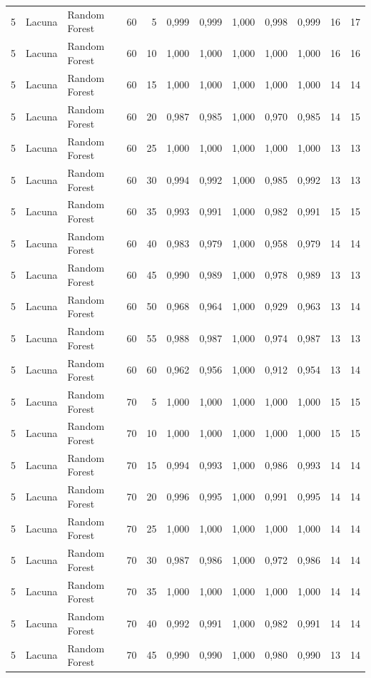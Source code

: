 \begin{longtable}{@{}rllrrrrrrrrr@{}}
5 & Lacuna & Random Forest & 60 & 5 & 0,999 & 0,999 & 1,000 & 0,998 & 0,999 & 16 & 17 \\
5 & Lacuna & Random Forest & 60 & 10 & 1,000 & 1,000 & 1,000 & 1,000 & 1,000 & 16 & 16 \\
5 & Lacuna & Random Forest & 60 & 15 & 1,000 & 1,000 & 1,000 & 1,000 & 1,000 & 14 & 14 \\
5 & Lacuna & Random Forest & 60 & 20 & 0,987 & 0,985 & 1,000 & 0,970 & 0,985 & 14 & 15 \\
5 & Lacuna & Random Forest & 60 & 25 & 1,000 & 1,000 & 1,000 & 1,000 & 1,000 & 13 & 13 \\
5 & Lacuna & Random Forest & 60 & 30 & 0,994 & 0,992 & 1,000 & 0,985 & 0,992 & 13 & 13 \\
5 & Lacuna & Random Forest & 60 & 35 & 0,993 & 0,991 & 1,000 & 0,982 & 0,991 & 15 & 15 \\
5 & Lacuna & Random Forest & 60 & 40 & 0,983 & 0,979 & 1,000 & 0,958 & 0,979 & 14 & 14 \\
5 & Lacuna & Random Forest & 60 & 45 & 0,990 & 0,989 & 1,000 & 0,978 & 0,989 & 13 & 13 \\
5 & Lacuna & Random Forest & 60 & 50 & 0,968 & 0,964 & 1,000 & 0,929 & 0,963 & 13 & 14 \\
5 & Lacuna & Random Forest & 60 & 55 & 0,988 & 0,987 & 1,000 & 0,974 & 0,987 & 13 & 13 \\
5 & Lacuna & Random Forest & 60 & 60 & 0,962 & 0,956 & 1,000 & 0,912 & 0,954 & 13 & 14 \\
5 & Lacuna & Random Forest & 70 & 5 & 1,000 & 1,000 & 1,000 & 1,000 & 1,000 & 15 & 15 \\
5 & Lacuna & Random Forest & 70 & 10 & 1,000 & 1,000 & 1,000 & 1,000 & 1,000 & 15 & 15 \\
5 & Lacuna & Random Forest & 70 & 15 & 0,994 & 0,993 & 1,000 & 0,986 & 0,993 & 14 & 14 \\
5 & Lacuna & Random Forest & 70 & 20 & 0,996 & 0,995 & 1,000 & 0,991 & 0,995 & 14 & 14 \\
5 & Lacuna & Random Forest & 70 & 25 & 1,000 & 1,000 & 1,000 & 1,000 & 1,000 & 14 & 14 \\
5 & Lacuna & Random Forest & 70 & 30 & 0,987 & 0,986 & 1,000 & 0,972 & 0,986 & 14 & 14 \\
5 & Lacuna & Random Forest & 70 & 35 & 1,000 & 1,000 & 1,000 & 1,000 & 1,000 & 14 & 14 \\
5 & Lacuna & Random Forest & 70 & 40 & 0,992 & 0,991 & 1,000 & 0,982 & 0,991 & 14 & 14 \\
5 & Lacuna & Random Forest & 70 & 45 & 0,990 & 0,990 & 1,000 & 0,980 & 0,990 & 13 & 14 \\

\end{longtable}
